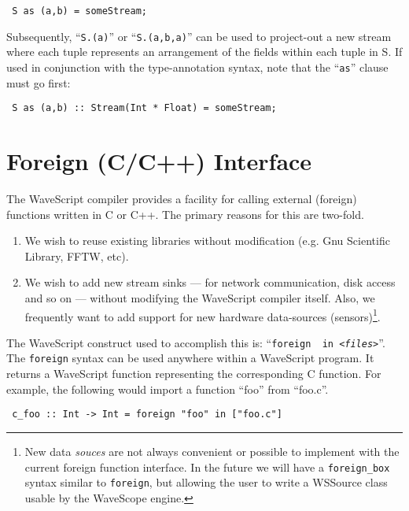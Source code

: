 \documentclass[twocolumn]{report}
\newenvironment{wscode}{\begin{center}\tt}{\end{center}}
\begin{document}
\begin{wscode}
S as (a,b) = someStream;
\end{wscode}

Subsequently, ``{\tt S.(a)}'' or ``{\tt S.(a,b,a)}'' can be used to
project-out a new stream where each tuple represents an arrangement of
the fields within each tuple in {S}.  If used in conjunction with the
type-annotation syntax, note that the ``{\tt as}'' clause must go first:

\begin{wscode}
S as (a,b) :: Stream(Int * Float) = someStream;
\end{wscode}





\chapter{Foreign (C/C++) Interface}

The WaveScript compiler provides a facility for calling external
(foreign) functions written in C or C++.  The primary reasons for this
are two-fold.

\begin{enumerate}
\item We wish to reuse existing libraries without modification (e.g. Gnu
  Scientific Library, FFTW, etc).
\item We wish to add new stream sinks --- for network communication, disk access and so
  on --- without modifying the WaveScript compiler itself.  Also, we
  frequently want to add support for new hardware data-sources
  (sensors)\footnote{New data {\em souces} are not always convenient
  or possible to implement
  with the current foreign function interface.  In the future we will
  have a {\tt foreign\_box} syntax similar to {\tt foreign}, but
  allowing the user to write a WSSource class usable by the WaveScope engine.}.
\end{enumerate}

The WaveScript construct used to accomplish this is:
  ``{\tt foreign {\em <function-name>} in {\em <files>}}''.
The {\tt foreign} syntax can be used anywhere within a WaveScript
program.  It returns a WaveScript function representing the
corresponding C function.
For example, the following would import a function ``foo'' from ``foo.c''.

\begin{wscode}
c\_foo :: Int -> Int = foreign "foo" in ["foo.c"]
\end{wscode}
\end{document}
